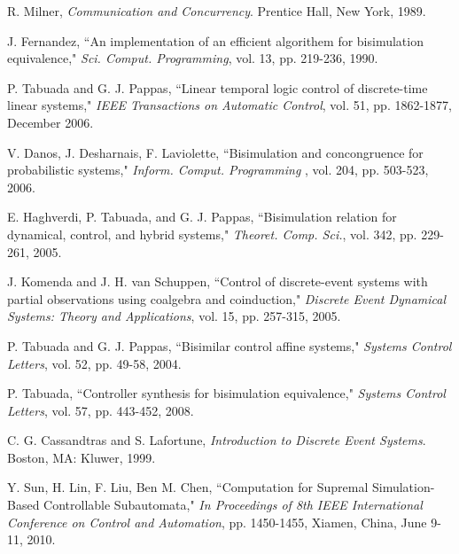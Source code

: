 \documentclass[12pt,draftcls,onecolumn]{IEEEtran}
\begin{document}
\begin{thebibliography}{99}











R. Milner, {\it Communication and Concurrency}. Prentice Hall, New
York, 1989.



J. Fernandez, ``An implementation
of an efficient algorithem for bisimulation equivalence," {\it Sci.
Comput. Programming}, vol. 13, pp. 219-236, 1990.

P. Tabuada and G. J. Pappas, ``Linear temporal logic control of discrete-time linear
systems," {\it IEEE Transactions on Automatic Control}, vol. 51, pp.
1862-1877, December 2006.


V. Danos, J. Desharnais, F. Laviolette, ``Bisimulation and concongruence for probabilistic
systems," {\it Inform. Comput. Programming }, vol. 204, pp. 503-523,
2006.

E. Haghverdi, P. Tabuada, and G. J. Pappas, ``Bisimulation relation for dynamical, control, and hybrid
systems," {\it Theoret. Comp. Sci.}, vol. 342, pp. 229-261, 2005.

J. Komenda and J. H. van Schuppen, ``Control of discrete-event systems with partial observations using coalgebra and
coinduction," {\it Discrete Event Dynamical Systems: Theory and
Applications}, vol. 15, pp. 257-315, 2005.




P. Tabuada and G. J. Pappas, ``Bisimilar control affine
systems," {\it Systems  Control Letters},  vol. 52, pp. 49-58,
2004.

P. Tabuada, ``Controller synthesis for bisimulation
equivalence," {\it Systems  Control Letters}, vol. 57, pp.
443-452, 2008.






C. G. Cassandtras and S. Lafortune, {\it Introduction to
Discrete Event Systems}. Boston, MA: Kluwer, 1999.

Y. Sun, H. Lin, F. Liu, Ben M. Chen,
``Computation for Supremal Simulation-Based Controllable
Subautomata," {\it In Proceedings of 8th IEEE International
Conference on Control and Automation}, pp. 1450-1455, Xiamen,
China, June 9-11, 2010.



\end{thebibliography}
\end{document}
